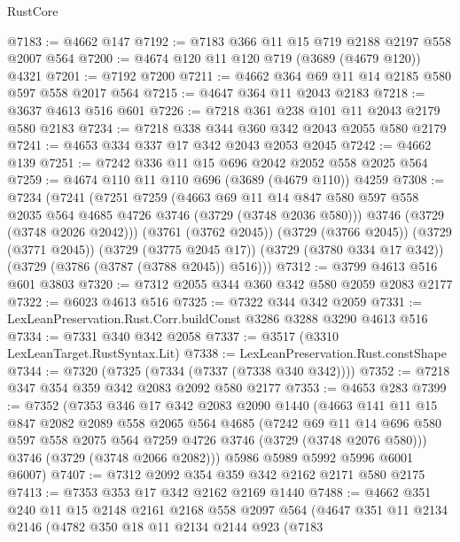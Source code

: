 \begin{lexlean}{RustCore}
\begin{coremodule}
@7183 := @4662 @147
@7192 := @7183 @366 @11 @15 @719 @2188 @2197 @558 @2007 @564
@7200 := @4674 @120 @11 @120 @719 (@3689 (@4679 @120)) @4321
@7201 := @7192 @7200
@7211 := @4662 @364 @69 @11 @14 @2185 @580 @597 @558 @2017 @564
@7215 := @4647 @364 @11 @2043 @2183
@7218 := @3637 @4613 @516 @601
@7226 := @7218 @361 @238 @101 @11 @2043 @2179 @580 @2183
@7234 := @7218 @338 @344 @360 @342 @2043 @2055 @580 @2179
@7241 := @4653 @334 @337 @17 @342 @2043 @2053 @2045
@7242 := @4662 @139
@7251 := @7242 @336 @11 @15 @696 @2042 @2052 @558 @2025 @564
@7259 := @4674 @110 @11 @110 @696 (@3689 (@4679 @110)) @4259
@7308 := @7234
    (@7241
      (@7251
        @7259
        (@4663
          @69
          @11
          @14
          @847
          @580
          @597
          @558
          @2035
          @564
          @4685
          @4726
          @3746
          (@3729 (@3748 @2036 @580)))
        @3746
        (@3729 (@3748 @2026 @2042)))
      (@3761 (@3762 @2045))
      (@3729 (@3766 @2045))
      (@3729 (@3771 @2045))
      (@3729 (@3775 @2045 @17))
      (@3729 (@3780 @334 @17 @342))
      (@3729 (@3786 (@3787 (@3788 @2045)) @516)))
@7312 := @3799 @4613 @516 @601 @3803
@7320 := @7312 @2055 @344 @360 @342 @580 @2059 @2083 @2177
@7322 := @6023 @4613 @516
@7325 := @7322 @344 @342 @2059
@7331 := LexLeanPreservation.Rust.Corr.buildConst @3286 @3288 @3290 @4613 @516
@7334 := @7331 @340 @342 @2058
@7337 := @3517 (@3310 LexLeanTarget.RustSyntax.Lit)
@7338 := LexLeanPreservation.Rust.constShape
@7344 := @7320 (@7325 (@7334 (@7337 (@7338 @340 @342))))
@7352 := @7218 @347 @354 @359 @342 @2083 @2092 @580 @2177
@7353 := @4653 @283
@7399 := @7352
    (@7353
      @346
      @17
      @342
      @2083
      @2090
      @1440
      (@4663
        @141
        @11
        @15
        @847
        @2082
        @2089
        @558
        @2065
        @564
        @4685
        (@7242
          @69
          @11
          @14
          @696
          @580
          @597
          @558
          @2075
          @564
          @7259
          @4726
          @3746
          (@3729 (@3748 @2076 @580)))
        @3746
        (@3729 (@3748 @2066 @2082)))
      @5986
      @5989
      @5992
      @5996
      @6001
      @6007)
@7407 := @7312 @2092 @354 @359 @342 @2162 @2171 @580 @2175
@7413 := @7353 @353 @17 @342 @2162 @2169 @1440
@7488 := @4662
    @351
    @240
    @11
    @15
    @2148
    @2161
    @2168
    @558
    @2097
    @564
    (@4647
      @351
      @11
      @2134
      @2146
      (@4782
        @350
        @18
        @11
        @2134
        @2144
        @923
        (@7183

\end{coremodule}
\end{lexlean}
